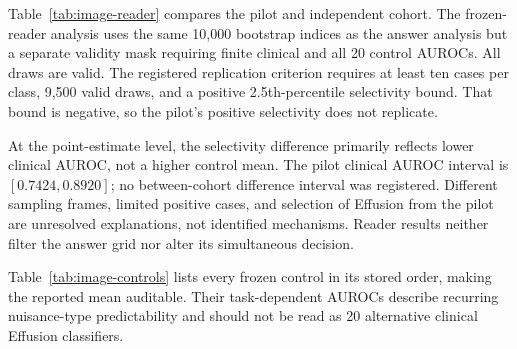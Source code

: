 Table~\ref{tab:image-reader} compares the pilot and independent cohort.
The frozen-reader analysis uses the same 10,000 bootstrap indices as the
answer analysis but a separate validity mask requiring finite clinical
and all 20 control AUROCs. All draws are valid. The registered replication
criterion requires at least ten cases per class, 9,500 valid draws, and
a positive 2.5th-percentile selectivity bound. That bound is negative, so
the pilot's positive selectivity does not replicate.

\begin{table}[H]
\centering
\caption{Frozen-reader performance across the two cohorts.}
\label{tab:image-reader}
\end{table}

At the point-estimate level, the selectivity difference primarily reflects
lower clinical AUROC, not a higher control mean. The pilot clinical AUROC
interval is $[0.7424,0.8920]$; no between-cohort difference interval was
registered. Different sampling frames, limited positive cases, and
selection of Effusion from the pilot are unresolved explanations, not
identified mechanisms. Reader results neither filter the answer grid nor
alter its simultaneous decision.

Table~\ref{tab:image-controls} lists every frozen control in its stored
order, making the reported mean auditable. Their task-dependent AUROCs
describe recurring nuisance-type predictability and should not be read as
20 alternative clinical Effusion classifiers.

